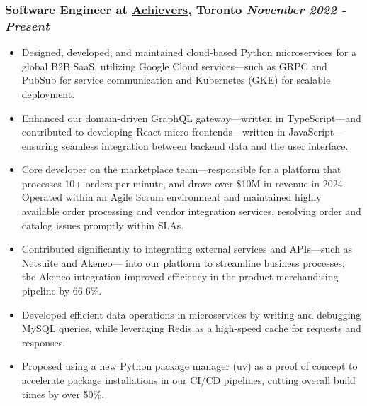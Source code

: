 \documentclass[a4paper,10pt]{article}
\begin{document}
\subsubsection*{%
  \textbf{Software Engineer} at \href{https://www.achievers.com/}{Achievers}, Toronto
  \hfill
  \textit{November 2022 - Present}
}
\begin{itemize}
  \item Designed, developed, and maintained cloud-based Python microservices for a global B2B SaaS, utilizing
  Google Cloud services---such as GRPC and PubSub for service communication and Kubernetes (GKE) for scalable deployment.

  \item Enhanced our domain-driven GraphQL gateway---written in TypeScript---and contributed to
  developing React micro-frontends---written in JavaScript---ensuring seamless integration between backend data and the user interface.


  \item Core developer on the marketplace team---responsible for a platform that processes 10+ orders per minute, and drove over \$10M in
  revenue in 2024. Operated within an Agile Scrum environment and maintained highly available order processing and vendor integration
  services, resolving order and catalog issues promptly within SLAs.

  \item Contributed significantly to integrating external services and APIs---such as Netsuite and Akeneo--- into our platform to streamline
  business processes; the Akeneo integration improved efficiency in the product merchandising pipeline by 66.6\%.

  \item Developed efficient data operations in microservices by writing and debugging MySQL queries,
    while leveraging Redis as a high-speed cache for requests and responses.
  \item Proposed using a new Python package manager (uv) as a proof of concept to accelerate package installations in our CI/CD
    pipelines, cutting overall build times by over 50\%.
\end{itemize}
\end{document}
